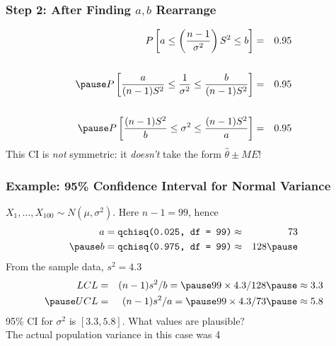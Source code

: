 \documentclass[handout]{beamer}
\begin{document}
\begin{frame}
\frametitle{Step 2: After Finding $a,b$ Rearrange}
 	\begin{eqnarray*}
 		P\left[ a\leq   \left( \frac{n-1}{\sigma^2}\right)S^2 \leq b \right] &=& 0.95 \\ \\ \pause
 		P\left[ \frac{a}{(n-1)S^2}\leq  \frac{1}{\sigma^2} \leq \frac{b}{(n-1)S^2} \right] &=& 0.95 \\ \\ \pause
 				P\left[ \frac{(n-1)S^2}{b}\leq  \sigma^2 \leq \frac{(n-1)S^2}{a} \right] &=& 0.95
 	\end{eqnarray*}	
 	\pause
\alert{This CI is \emph{not} symmetric: it \emph{doesn't} take the form $\widehat{\theta} \pm ME$!}
\end{frame}
\begin{frame}
\frametitle{Example: 95\% Confidence Interval for Normal Variance}
$X_1, \hdots, X_{100} \sim N(\mu,\sigma^2)$. Here $n-1 = 99$, hence \pause
	\begin{eqnarray*}
		a = \texttt{qchisq(0.025, df = 99)} &\approx& 73\\ \pause
		b = \texttt{qchisq(0.975, df = 99)} &\approx& 128 \pause
	\end{eqnarray*}	
From the sample data, $s^2 = 4.3$
	\begin{eqnarray*}
		LCL &=& (n-1)s^2/b = \pause 99 \times 4.3/128 \pause \approx 3.3\\ \pause
		UCL &=& (n-1)s^2/a = \pause 99 \times 4.3/73 \pause \approx  5.8
	\end{eqnarray*}
	\pause
	\alert{95\% CI for $\sigma^2$ is $[3.3, 5.8]$. What values are plausible?}\\
	\pause
	The actual population variance in this case was 4
\end{frame}
\end{document}
